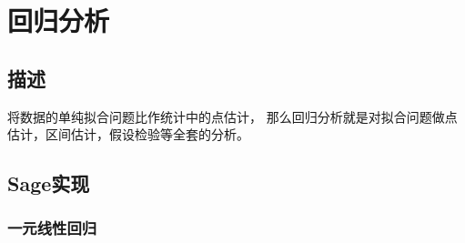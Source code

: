 \section{回归分析}
\subsection{描述}
将数据的单纯拟合问题比作统计中的点估计，
那么回归分析就是对拟合问题做点估计，区间估计，假设检验等全套的分析。

\subsection{Sage实现}
\subsubsection{一元线性回归}



